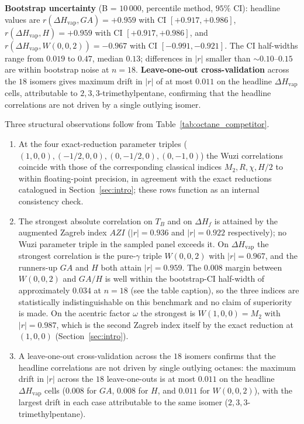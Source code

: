 \documentclass[a5paper, 10pt]{article}
\theoremstyle{plain}
\theoremstyle{remark}
\theoremstyle{definition}
\begin{document}
\begin{table}[H]
\vspace{0.4em}
\noindent\footnotesize{\textbf{Bootstrap uncertainty} (B = $10\,000$, percentile method, $95\%$ CI): headline values are $r(\Delta H_{\mathrm{vap}}, GA) = +0.959$ with CI $[+0.917, +0.986]$, $r(\Delta H_{\mathrm{vap}}, H) = +0.959$ with CI $[+0.917, +0.986]$, and $r(\Delta H_{\mathrm{vap}}, W(0,0,2)) = -0.967$ with CI $[-0.991, -0.921]$. The CI half-widths range from $0.019$ to $0.47$, median $0.13$; differences in $|r|$ smaller than ${\sim}0.10$--$0.15$ are within bootstrap noise at $n = 18$. \textbf{Leave-one-out cross-validation} across the $18$ isomers gives maximum drift in $|r|$ of at most $0.011$ on the headline $\Delta H_{\mathrm{vap}}$ cells, attributable to $2,3,3$-trimethylpentane, confirming that the headline correlations are not driven by a single outlying isomer.}
\end{table}

Three structural observations follow from
Table~\ref{tab:octane_competitor}.

\begin{enumerate}[label=(\alph*)]
\item At the four exact-reduction parameter triples
($(1, 0, 0), (-1/2, 0, 0), (0, -1/2, 0), (0, -1, 0)$) the Wuzi
correlations coincide with those of the corresponding classical
indices $M_2, R, \chi, H/2$ to within floating-point precision,
in agreement with the exact reductions catalogued in
Section~\ref{sec:intro}; these rows function as an internal
consistency check.

\item The strongest absolute correlation on $T_B$ and on
$\Delta H_f$ is attained by the augmented Zagreb index $AZI$
($|r| = 0.936$ and $|r| = 0.922$ respectively); no Wuzi
parameter triple in the sampled panel exceeds it. On
$\Delta H_{\mathrm{vap}}$ the strongest correlation is the
pure-$\gamma$ triple $W(0, 0, 2)$ with $|r| = 0.967$, and the
runners-up $GA$ and $H$ both attain $|r| = 0.959$. The $0.008$
margin between $W(0, 0, 2)$ and $GA / H$ is well within the
bootstrap-CI half-width of approximately $0.034$ at $n = 18$
(see the table caption), so the three indices are statistically
indistinguishable on this benchmark and no claim of superiority
is made. On the acentric factor $\omega$ the strongest is
$W(1, 0, 0) = M_2$ with $|r| = 0.987$, which is the second
Zagreb index itself by the exact reduction at $(1, 0, 0)$
(Section~\ref{sec:intro}).

\item A leave-one-out cross-validation across the $18$ isomers
confirms that the headline correlations are not driven by single
outlying octanes: the maximum drift in $|r|$ across the $18$
leave-one-outs is at most $0.011$ on the headline
$\Delta H_{\mathrm{vap}}$ cells ($0.008$ for $GA$, $0.008$ for
$H$, and $0.011$ for $W(0, 0, 2)$), with the largest drift in
each case attributable to the same isomer
($2, 3, 3$-trimethylpentane).
\end{enumerate}
\end{document}
